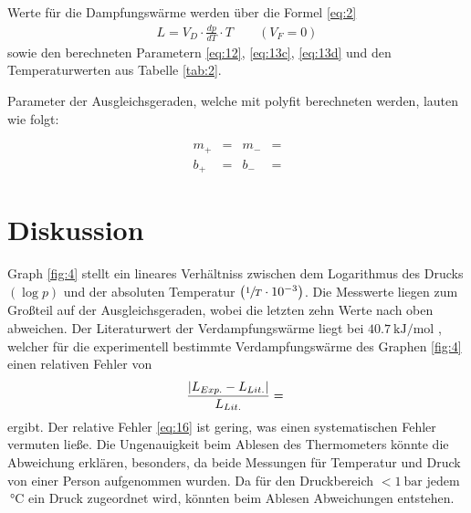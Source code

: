 \justifying Werte für die Dampfungswärme werden über die Formel \eqref{eq:2}  
\begin{align}
    L= V_D \cdot \frac{dp}{dT}\cdot T \qquad (V_F = 0) \label{eq:14}
\end{align}
sowie den berechneten Parametern \eqref{eq:12}, \eqref{eq:13c}, \eqref{eq:13d} und den Temperaturwerten aus Tabelle \ref{tab:2}.

\justifying Parameter der Ausgleichsgeraden, welche mit polyfit \cite{numpy} berechneten werden, lauten wie folgt:

\begin{subequations} \label{eq:15}
\begin{align}
    m_{+} &= \text{}  &m_{-} &=\text{}  \label{eq:15a}\\
    b_{+} &= \text{} &b_{-} &= \text{}  \label{eq:15b}
\end{align}
\end{subequations}
\newpage


\section{Diskussion}

\justifying Graph \ref{fig:4} stellt ein lineares Verhältniss zwischen dem Logarithmus des Drucks $\left( \log{p} \right)$ und 
der absoluten Temperatur $\left( \sfrac{1}{T} \cdot 10^{-3} \right)$. Die Messwerte liegen zum Großteil auf der Ausgleichsgeraden, wobei die letzten 
zehn Werte nach oben abweichen. Der Literaturwert der Verdampfungswärme liegt bei $\SI{40.7}{\kilo\joule\per\mole}$ \cite{Verdampfungswärme}, welcher
für die experimentell bestimmte Verdampfungswärme des Graphen \ref{fig:4} einen relativen Fehler von
\begin{equation}
    \frac{\lvert L_{Exp.} - L_{Lit.}\rvert}{L_{Lit.}} = \text{} \label{eq:16}
\end{equation}
ergibt. Der relative Fehler \eqref{eq:16} ist gering, was einen systematischen Fehler vermuten ließe. Die Ungenauigkeit beim Ablesen des Thermometers
könnte die Abweichung erklären, besonders, da beide Messungen für Temperatur und Druck von einer Person aufgenommen wurden. Da für den Druckbereich
$< \SI{1}{\bar}$ jedem $\SI{}{\celsius}$ ein Druck zugeordnet wird, könnten beim Ablesen Abweichungen entstehen.

